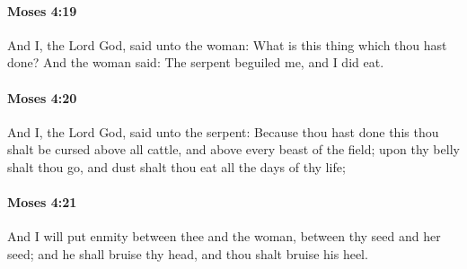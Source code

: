 		\paragraph{Moses 4:19} %
			\label{MOSES-4-19}

			And I, the Lord God, said unto the woman: What is this thing which thou hast done? And the woman said: The serpent beguiled me, and I did eat.


		\paragraph{Moses 4:20} %
			\label{MOSES-4-20}

			And I, the Lord God, said unto the serpent: Because thou hast done this thou shalt be cursed above all cattle, and above every beast of the field; upon thy belly shalt thou go, and dust shalt thou eat all the days of thy life;


		\paragraph{Moses 4:21} %
			\label{MOSES-4-21}

			And I will put enmity between thee and the woman, between thy seed and her seed; and he shall bruise thy head, and thou shalt bruise his heel.


